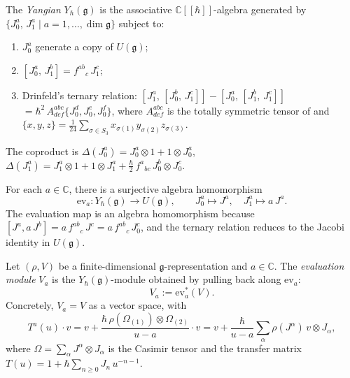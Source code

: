 \begin{definition}
\label{def:yangian-drinfeld}
The \emph{Yangian} $Y_\hbar(\mathfrak{g})$ is the associative
$\mathbb{C}[\![\hbar]\!]$-algebra generated by
$\{J^a_0,\,J^a_1\mid a=1,\dots,\dim\mathfrak{g}\}$
subject to:
\begin{enumerate}[label=(\roman*)]
\item $J^a_0$ generate a copy of $U(\mathfrak{g})$;
\item $[J^a_0,\,J^b_1]=f^{ab}{}_c\,J^c_1$;
\item Drinfeld's ternary relation:
$[J^a_1,\,[J^b_0,\,J^c_1]]-[J^a_0,\,[J^b_1,\,J^c_1]]$
$=\hbar^2\,A^{abc}_{def}\{J^d_0,J^e_0,J^f_0\}$,
where $A^{abc}_{def}$ is the totally symmetric tensor
of \textup{\cite{Drinfeld-Yangians}} and
$\{x,y,z\}=\tfrac{1}{24}\sum_{\sigma\in S_3}x_{\sigma(1)}y_{\sigma(2)}z_{\sigma(3)}$.
\end{enumerate}
The coproduct is
$\Delta(J^a_0)=J^a_0\otimes 1+1\otimes J^a_0$,
$\Delta(J^a_1)=J^a_1\otimes 1+1\otimes J^a_1
+\tfrac{\hbar}{2}\,f^a{}_{bc}\,J^b_0\otimes J^c_0$.
\end{definition}

\begin{construction}
\ClaimStatusProvedHere
\label{constr:evaluation-map}
For each $a\in\mathbb{C}$, there is a surjective algebra
homomorphism
\[
\mathrm{ev}_a\colon
Y_\hbar(\mathfrak{g})\longrightarrow U(\mathfrak{g}),
\qquad
J^a_0\mapsto J^a,
\quad
J^a_1\mapsto a\,J^a.
\]
The evaluation map is an algebra homomorphism because
$[J^a,a\,J^b]=a\,f^{ab}{}_c\,J^c=a\,f^{ab}{}_c\,J^c_0$,
and the ternary relation reduces to the Jacobi identity in
$U(\mathfrak{g})$.
\end{construction}

\begin{definition}
\label{def:evaluation-module-app}
\ClaimStatusDefinitional
Let $(\rho,V)$ be a finite-dimensional
$\mathfrak{g}$-representation and $a\in\mathbb{C}$.
The \emph{evaluation module} $V_a$ is the
$Y_\hbar(\mathfrak{g})$-module obtained by pulling back
along $\mathrm{ev}_a$:
\[
V_a
:=
\mathrm{ev}_a^*(V).
\]
Concretely, $V_a=V$ as a vector space, with
\begin{equation}\label{eq:eval-transfer-matrix}
T^a(u)\cdot v
=
v+\frac{\hbar\,\rho(\Omega_{(1)})\otimes\Omega_{(2)}}{u-a}\cdot v
=
v+\frac{\hbar}{u-a}\sum_\alpha
\rho(J^\alpha)\,v\otimes J_\alpha,
\end{equation}
where $\Omega=\sum_\alpha J^\alpha\otimes J_\alpha$
is the Casimir tensor and the transfer matrix
$T(u)=1+\hbar\sum_{n\geq 0}J_n\, u^{-n-1}$.
\end{definition}

